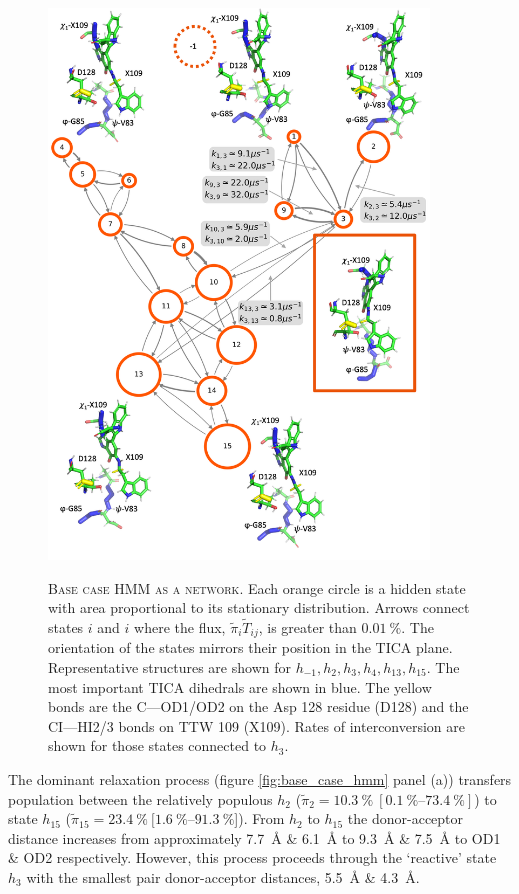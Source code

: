\begin{figure}[p]
    \centering
    \caption[Base case HMM as a network]{\textsc{Base case HMM as a network}. Each orange circle is a hidden state with area proportional to its stationary distribution. Arrows connect states $i$ and $i$ where the flux, $\tilde{\pi}_{i}\tilde{T}_{ij}$, is greater than $\SI{0.01}{\percent}$. The orientation of the states mirrors their position in the TICA plane. Representative structures are shown for $h_{-1}, h_{2}, h_{3}, h_{4}, h_{13}, h_{15}$. The most important TICA dihedrals are shown in blue. The yellow bonds are the C---OD1/OD2 on the Asp 128 residue (D128) and the CI---HI2/3 bonds on TTW 109 (X109). Rates of interconversion are shown for those states connected to $h_{3}$. }
    \includegraphics[width=0.9\textwidth]{chapters/aadh/figures/base_case_network_plot.png}
    \label{fig:aadh_base_case_network}
\end{figure}

 The dominant relaxation process (figure \ref{fig:base_case_hmm} panel (a)) transfers population between the relatively populous $h_{2}$ ($\tilde{\pi}_{2} = \SI{10.3}{\percent}\ [\SIrange[range-phrase=\text{--}]{0.1}{73.4}{\percent}]$) to state $h_{15}$ ($\tilde{\pi}_{15}=\SI{23.4}{\percent}\ [\SIrange[range-phrase=\text{--}]{1.6}{91.3}{\percent}$]). From $h_{2}$ to $h_{15}$ the donor-acceptor distance increases from approximately \SI{7.7}{\angstrom} \& \SI{6.1}{\angstrom} to \SI{9.3}{\angstrom} \& \SI{7.5}{\angstrom} to OD1 \& OD2 respectively. However, this process proceeds through the `reactive' state $h_{3}$ with the smallest pair donor-acceptor distances, \SI{5.5}{\angstrom} \& \SI{4.3}{\angstrom}.  
 
